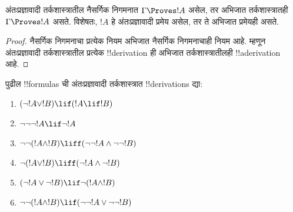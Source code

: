 \documentclass[../../../include/open-logic-section]{subfiles}
\begin{document}
\begin{prop}
  अंतःप्रज्ञावादी तर्कशास्त्रातील नैसर्गिक निगमनात
  $\Gamma \Proves !A$ असेल, तर अभिजात तर्कशास्त्रातही
  $\Gamma \Proves !A$ असते. विशेषतः, $!A$ हे
  अंतःप्रज्ञावादी प्रमेय असेल, तर ते अभिजात प्रमेयही असते.
\end{prop}

\begin{proof}
  नैसर्गिक निगमनाचा प्रत्येक नियम अभिजात नैसर्गिक
  निगमनाचाही नियम आहे. म्हणून अंतःप्रज्ञावादी
  तर्कशास्त्रातील प्रत्येक !!{derivation} ही अभिजात
  तर्कशास्त्रातीलही !!a{derivation} आहे.
\end{proof}

\begin{prob}
  पुढील !!{formula}s ची अंतःप्रज्ञावादी तर्कशास्त्रात
  !!{derivation}s द्या:
  \begin{enumerate}
    \item $(\lnot !A \lor !B) \lif (!A \lif !B)$
    \item $\lnot\lnot\lnot !A \lif \lnot !A$
    \item $\lnot\lnot (!A \land !B) \liff (\lnot\lnot !A\land \lnot \lnot !B)$
    \item $\lnot (!A \lor !B) \liff (\lnot !A \land \lnot !B)$
    \item $(\lnot !A \lor \lnot !B) \lif \lnot (!A \land !B)$
    \item $\lnot\lnot ( !A \land !B) \lif  (\lnot\lnot !A \lor
    \lnot\lnot !B)$
  \end{enumerate}
\end{prob}
\end{document}

